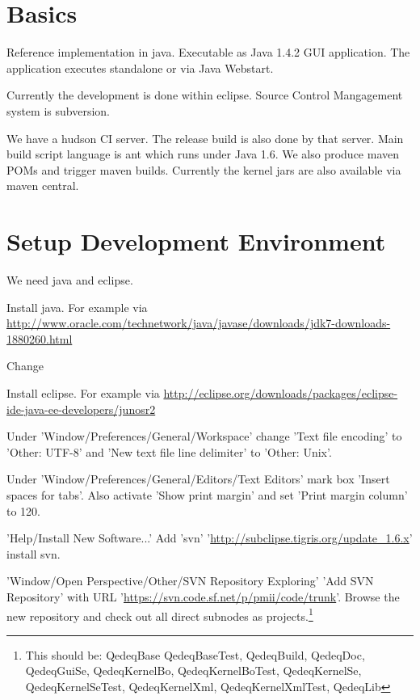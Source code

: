 \documentclass[a4paper,german,10pt,twoside]{book}
\theoremstyle{definition}
\theoremstyle{remark}
\begin{document}
\section{Basics} \label{chapter1_section1} \hypertarget{chapter1_section1}{}
Reference implementation in java. Executable as Java 1.4.2 GUI application. The application executes standalone or via Java Webstart.

\par
Currently the development is done within eclipse. Source Control Mangagement system is subversion.

\par
We have a hudson CI server. The release build is also done by that server. Main build script language is ant which runs under Java 1.6. We also produce maven POMs and trigger maven builds. Currently the kernel jars are also available via maven central.

\section{Setup Development Environment} \label{chapter1_section2} \hypertarget{chapter1_section2}{}
We need java and eclipse.

Install java. For example via \url{http://www.oracle.com/technetwork/java/javase/downloads/jdk7-downloads-1880260.html}
    
\par
Change


Install eclipse. For example via \url{http://eclipse.org/downloads/packages/eclipse-ide-java-ee-developers/junosr2}
    
\par
Under 'Window/Preferences/General/Workspace' change 'Text file encoding' to 'Other: UTF-8' and 'New text file line delimiter' to 'Other: Unix'.

\par
Under 'Window/Preferences/General/Editors/Text Editors' mark box 'Insert spaces for tabs'. Also activate 'Show print margin' and set 'Print margin column' to 120.

\par
'Help/Install New Software...' Add 'svn' '\url{http://subclipse.tigris.org/update_1.6.x}' install svn.
               
\par
'Window/Open Perspective/Other/SVN Repository Exploring' 'Add SVN Repository' with URL '\url{https://svn.code.sf.net/p/pmii/code/trunk}'. Browse the new repository and check out all direct subnodes as projects.\footnote{This should be: QedeqBase
QedeqBaseTest, QedeqBuild, QedeqDoc, QedeqGuiSe, QedeqKernelBo, QedeqKernelBoTest, QedeqKernelSe, QedeqKernelSeTest, QedeqKernelXml, QedeqKernelXmlTest, QedeqLib}
\end{document}

